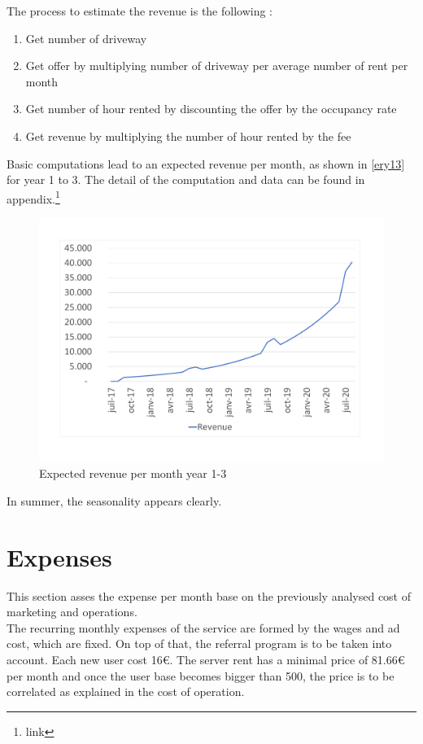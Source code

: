 \documentclass[12pt,a4paper,oneside]{book}
\begin{document}
The process to estimate the revenue is the following :
\begin{enumerate}
\item Get number of driveway
\item Get offer by multiplying number of driveway per average number of rent per month
\item Get number of hour rented by discounting the offer by the occupancy rate
\item Get revenue by multiplying the number of hour rented by the fee
\end{enumerate}

Basic computations lead to an expected revenue per month, as shown in \autoref{ery13} for year 1 to 3. The detail of the computation and data can be found in appendix.\footnote{link}\\

\begin{figure}[h]
\centering
\caption{Expected revenue per month year 1-3}
\label{ery13}
\includegraphics[keepaspectratio=true,width=\textwidth-2cm]{../graph/expectedrev.pdf}
\end{figure}

In summer, the seasonality appears clearly.

\section{Expenses}
This section asses the expense per month base on the previously analysed cost of marketing and operations.\\

The recurring monthly expenses of the service are formed by the wages and ad cost, which are fixed. On top of that, the referral program is to be taken into account. Each new user cost 16\euro{}. The server rent has a minimal price of 81.66\euro{} per month and once the user base becomes bigger than 500, the price is to be correlated as explained in the cost of operation.\\
\end{document}
